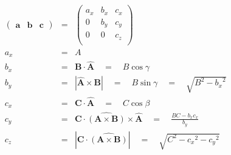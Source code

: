 \documentclass[12pt]{article}
\begin{document}
\begin{eqnarray*}
\begin{pmatrix}
\mathbf{a}  &
\mathbf{b}  &
\mathbf{c} 
\end{pmatrix}
& = &
\begin{pmatrix}
a_x & b_x & c_x \\
0 & b_y & c_y \\
0 & 0 & c_z \\
\end{pmatrix} \\
a_x &=& A \\
b_x &=& \mathbf{B} \cdot \mathbf{\hat{A}} \quad = \quad B \cos{\gamma} \\
b_y &=& |\mathbf{\hat{A}} \times \mathbf{B}| \quad = \quad B \sin{\gamma} \quad =  \quad  \sqrt{B^2 - {b_x}^2} \\
c_x &=& \mathbf{C} \cdot \mathbf{\hat{A}} \quad = \quad C \cos{\beta} \\
c_y &=& \mathbf{C} \cdot \widehat{(\mathbf{A} \times \mathbf{B})} \times \mathbf{\hat{A}} \quad = \quad \frac{B C - b_x c_x}{b_y} \\
c_z &=& |\mathbf{C} \cdot \widehat{(\mathbf{A} \times \mathbf{B})}|\quad = \quad \sqrt{C^2 - {c_x}^2 - {c_y}^2} \\
\end{eqnarray*}
\end{document}
